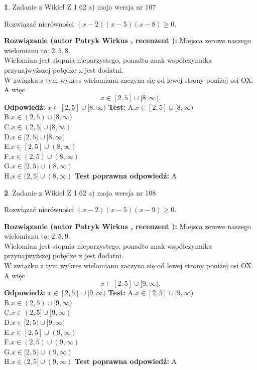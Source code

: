 \documentclass[12pt, a4paper]{article}
\theoremstyle{definition} %
\newtheorem{zad}{}
\newcommand{\zadStart}[1]{\begin{zad}#1\newline}
\newcommand{\zadStop}{\end{zad}}
\newcommand{\rozwStart}[2]{\noindent \textbf{Rozwiązanie (autor #1 , recenzent #2): }\newline}
\newcommand{\rozwStop}{\newline}
\newcommand{\odpStart}{\noindent \textbf{Odpowiedź:}\newline}
\newcommand{\odpStop}{\newline}
\newcommand{\testStart}{\noindent \textbf{Test:}\newline}
\newcommand{\testStop}{\newline}
\newcommand{\kluczStart}{\noindent \textbf{Test poprawna odpowiedź:}\newline}
\newcommand{\kluczStop}{\newline}
\begin{document}
\zadStart{Zadanie z Wikieł Z 1.62 a) moja wersja nr 107}

Rozwiązać nierówności $(x-2)(x-5)(x-8)\ge0$.
\zadStop
\rozwStart{Patryk Wirkus}{}
Miejsca zerowe naszego wielomianu to: $2, 5, 8$.\\
Wielomian jest stopnia nieparzystego, ponadto znak współczynnika przy\linebreak najwyższej potędze x jest dodatni.\\ W związku z tym wykres wielomianu zaczyna się od lewej strony poniżej osi OX. A więc $$x \in [2,5] \cup [8,\infty).$$
\rozwStop
\odpStart
$x \in [2,5] \cup [8,\infty)$
\odpStop
\testStart
A.$x \in [2,5] \cup [8,\infty)$\\
B.$x \in (2,5) \cup [8,\infty)$\\
C.$x \in (2,5] \cup [8,\infty)$\\
D.$x \in [2,5) \cup [8,\infty)$\\
E.$x \in [2,5] \cup (8,\infty)$\\
F.$x \in (2,5) \cup (8,\infty)$\\
G.$x \in [2,5) \cup (8,\infty)$\\
H.$x \in (2,5] \cup (8,\infty)$
\testStop
\kluczStart
A
\kluczStop



\zadStart{Zadanie z Wikieł Z 1.62 a) moja wersja nr 108}

Rozwiązać nierówności $(x-2)(x-5)(x-9)\ge0$.
\zadStop
\rozwStart{Patryk Wirkus}{}
Miejsca zerowe naszego wielomianu to: $2, 5, 9$.\\
Wielomian jest stopnia nieparzystego, ponadto znak współczynnika przy\linebreak najwyższej potędze x jest dodatni.\\ W związku z tym wykres wielomianu zaczyna się od lewej strony poniżej osi OX. A więc $$x \in [2,5] \cup [9,\infty).$$
\rozwStop
\odpStart
$x \in [2,5] \cup [9,\infty)$
\odpStop
\testStart
A.$x \in [2,5] \cup [9,\infty)$\\
B.$x \in (2,5) \cup [9,\infty)$\\
C.$x \in (2,5] \cup [9,\infty)$\\
D.$x \in [2,5) \cup [9,\infty)$\\
E.$x \in [2,5] \cup (9,\infty)$\\
F.$x \in (2,5) \cup (9,\infty)$\\
G.$x \in [2,5) \cup (9,\infty)$\\
H.$x \in (2,5] \cup (9,\infty)$
\testStop
\kluczStart
A
\kluczStop
\end{document}
